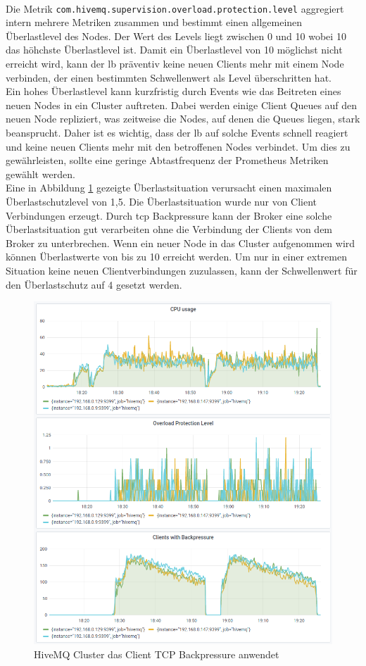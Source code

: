 \\
Die Metrik \verb|com.hivemq.supervision.overload.protection.level| aggregiert intern mehrere Metriken zusammen und bestimmt einen allgemeinen Überlastlevel des Nodes. Der Wert des Levels liegt zwischen 0 und 10 wobei 10 das höhchste Überlastlevel ist.
Damit ein Überlastlevel von 10 möglichst nicht erreicht wird, kann der \acl{lb} präventiv keine neuen Clients mehr mit einem Node verbinden, der einen bestimmten Schwellenwert als Level überschritten hat.
\\
Ein hohes Überlastlevel kann kurzfristig durch Events wie das Beitreten eines neuen Nodes in ein Cluster auftreten. Dabei werden einige Client Queues auf den neuen Node repliziert, was zeitweise die Nodes, auf denen die Queues liegen, stark beansprucht. Daher ist es wichtig, dass der \ac{lb} auf solche Events schnell reagiert und keine neuen Clients mehr mit den betroffenen Nodes verbindet.
Um dies zu gewährleisten, sollte eine geringe Abtastfrequenz der Prometheus Metriken gewählt werden.
\\
Eine in Abbildung \ref{fig:overload-protection} gezeigte Überlastsituation verursacht einen maximalen Überlastschutzlevel von 1,5.
Die Überlastsituation wurde nur von Client Verbindungen erzeugt. Durch \ac{tcp} Backpressure kann der Broker eine solche Überlastsituation gut verarbeiten ohne die Verbindung der Clients von dem Broker zu unterbrechen. Wenn ein neuer Node in das Cluster aufgenommen wird können Überlastwerte von bis zu 10 erreicht werden. Um nur in einer extremen Situation keine neuen Clientverbindungen zuzulassen, kann der Schwellenwert für den Überlastschutz auf 4 gesetzt werden.
\\
\begin{figure}
    \centering
    \includegraphics[scale=0.8]{images/overload-protection.png}
    \caption{HiveMQ Cluster das Client TCP Backpressure anwendet}
    \label{fig:overload-protection}
\end{figure}
